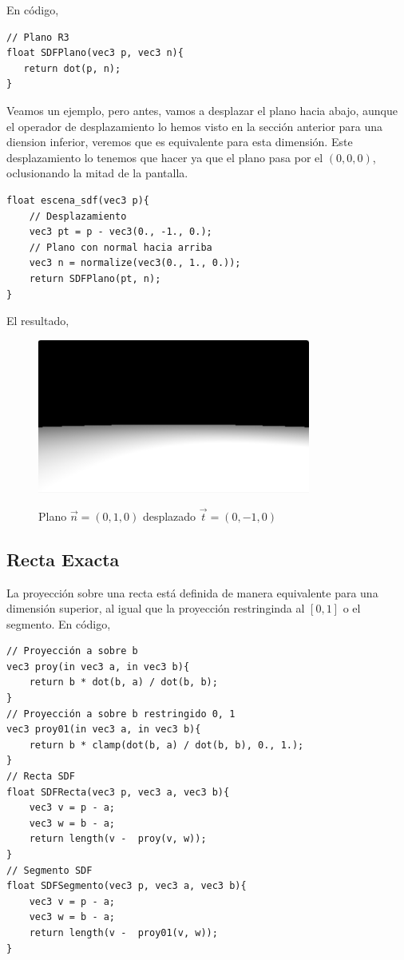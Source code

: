En código,

\begin{lstlisting}
// Plano R3
float SDFPlano(vec3 p, vec3 n){
   return dot(p, n);
}
\end{lstlisting}

Veamos un ejemplo, pero antes, vamos a desplazar el plano hacia abajo, aunque el operador de desplazamiento lo hemos visto en la sección anterior para una diension inferior, veremos que es equivalente para esta dimensión. Este desplazamiento lo tenemos que hacer ya que el plano pasa por el \((0,0,0)\), oclusionando la mitad de la pantalla.

\begin{lstlisting}
float escena_sdf(vec3 p){
    // Desplazamiento
    vec3 pt = p - vec3(0., -1., 0.);
    // Plano con normal hacia arriba
    vec3 n = normalize(vec3(0., 1., 0.));
    return SDFPlano(pt, n);
}
\end{lstlisting}

El resultado,

\begin{figure}[H]
  \centering
  \captionsetup{justification=centering}%
  \includegraphics[width=0.8\textwidth]{secciones/imagenes/sdf_plano.jpeg}\label{fig:plano}
  \caption{Plano \(\Vec{n}=(0,1,0)\) desplazado \(\Vec{t}=(0, -1, 0)\)}
\end{figure}

\subsection{Recta Exacta}

La proyección sobre una recta está definida de manera equivalente para una dimensión superior, al igual que la proyección restringinda al \([0,1]\) o el segmento.
En código,
\begin{lstlisting}
// Proyección a sobre b
vec3 proy(in vec3 a, in vec3 b){
    return b * dot(b, a) / dot(b, b);
}
// Proyección a sobre b restringido 0, 1
vec3 proy01(in vec3 a, in vec3 b){
    return b * clamp(dot(b, a) / dot(b, b), 0., 1.);
}
// Recta SDF
float SDFRecta(vec3 p, vec3 a, vec3 b){
    vec3 v = p - a;
    vec3 w = b - a;
    return length(v -  proy(v, w));
}
// Segmento SDF
float SDFSegmento(vec3 p, vec3 a, vec3 b){
    vec3 v = p - a;
    vec3 w = b - a;
    return length(v -  proy01(v, w));
}
\end{lstlisting}

